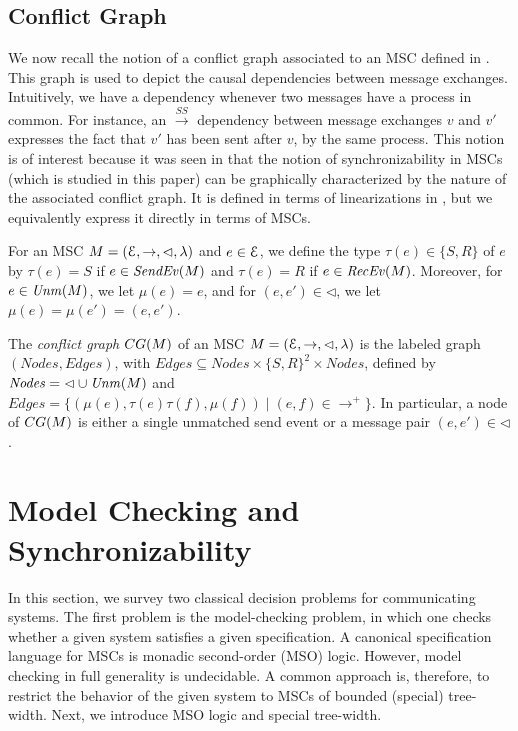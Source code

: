 \documentclass[a4paper,UKenglish,cleveref, autoref, thm-restate]{lipics-v2021}
\begin{document}
\subsection{Conflict Graph}

We now recall the notion of a conflict graph associated to an MSC defined in \cite{DBLP:conf/cav/BouajjaniEJQ18}. This graph is used to depict the causal dependencies between message exchanges.  Intuitively, we have a dependency whenever
two messages have a process in common. For instance, an $\xrightarrow{SS}$
dependency between message exchanges $v$ and $v'$ expresses the fact that
$v'$ has been sent after $v$, by the same process. This notion is of interest because it was seen in \cite{DBLP:conf/cav/BouajjaniEJQ18} that the notion of synchronizability in MSCs (which is studied in this paper) can be graphically characterized by the nature of the associated conflict graph.
It is defined in terms of linearizations
in \cite{DBLP:conf/fossacs/GiustoLL20}, but we equivalently express it
directly in terms of MSCs.

\newcommand{\type}{\tau}
\newcommand{\stype}{S}
\newcommand{\rtype}{R}
\newcommand{\mexch}{\mu}
\newcommand{\Edges}{\mathit{Edges}}
\newcommand{\Nodes}{\mathit{Nodes}}

For an MSC $M = (\mathcal{E}, \rightarrow, \lhd, \lambda)$ and
$e \in \mathcal{E}$, we define the type $\type(e) \in \{\stype,\rtype\}$ of $e$ by $\type(e) = \stype$ if $e \in \mathit{SendEv}(M)$
and $\type(e) = \rtype$ if $e \in \mathit{RecEv}(M)$.
Moreover, for $e \in \mathit{Unm}(M)$, we let $\mexch(e) = e$,
and for $(e,e') \in \lhd$, we let $\mexch(e) = \mexch(e') = (e,e')$.


\begin{definition}
	The \emph{conflict graph} $\cgraph{\msc}$ of an MSC $M = (\mathcal{E}, \rightarrow, \lhd, \lambda)$ is the labeled graph $(\Nodes, \Edges)$, with $\Edges \subseteq \Nodes \times \{\stype,\rtype\}^2 \times \Nodes$, defined by
	$\Nodes = {\lhd} \cup \Unm{\msc}$ and $\Edges = \{(\mu(e),\type(e)\type(f),\mu(f)) \mid (e,f) \in {\to^+}\}$.
In particular, a node of $\cgraph{\msc}$ is either a single unmatched send event or a message pair $(e,e') \in {\lhd}$.
\end{definition}


\section{Model Checking and Synchronizability}

In this section, we survey two classical decision problems
for communicating systems.
The first problem is the model-checking problem, in which
one checks whether a given system satisfies a given
specification. A canonical specification language for MSCs is
monadic second-order (MSO) logic.
However, model checking in full generality is undecidable.
A common approach is, therefore, to restrict the behavior of
the given system to MSCs of bounded (special) tree-width.
%
Next, we introduce MSO logic and special tree-width.
\end{document}
